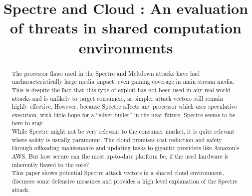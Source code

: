 \documentclass[conference,compsoc,final,a4paper]{IEEEtran}
\newcommand{\autoren}[0]{Mundhenke, Moritz}
\newcommand{\dokumententitel}[0]{Spectre and Cloud : An evaluation of threats in shared computation environments }
\begin{document}
\title{\dokumententitel}

\author{
  \IEEEauthorblockN{\autoren}
}

\maketitle
\thispagestyle{plain}
\pagestyle{plain}


\begin{abstract}
The processor flaws used in the Spectre and Meltdown attacks have had uncharacteristically large media impact, even gaining coverage in main stream media. This is despite the fact that this type of exploit has not been used in any real world attacks and is unlikely to target consumers, as simpler attack vectors still remain highly effective. However, because Spectre affects any processor which uses speculative execution, with little hope for a \enquote{silver bullet} in the near future, Spectre seems to be here to stay. \\
While Spectre might not be very relevant to the consumer market, it is quite relevant where safety is usually paramount. The cloud promises cost reduction and safety through offloading maintenance and updating tasks to gigantic providers like Amazon's \acs{AWS}. But how secure can the most up-to-date platform be, if the used hardware is inherently flawed to the core? \\
This paper shows potential Spectre attack vectors in a shared cloud environment, discusses some defensive measures and provides a high level explanation of the Spectre attack.
\end{abstract}

\tableofcontents

\end{document}
